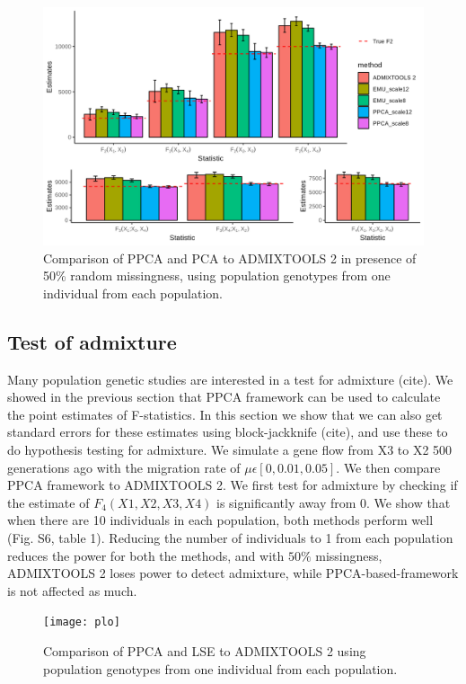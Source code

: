 \documentclass[12pt, letterpaper]{article}
\begin{document}
\begin{figure}[ht!]
    \includegraphics[width=16.5cm]{plots/simfiles/Ne1000/split_times1000/npop10_nind100/missing0.5/plots_8_12/mu0.05_plot_all_1ind_missing.png}
    \centering
    \caption{Comparison of PPCA and PCA to ADMIXTOOLS 2 in presence of 50\% random missingness, using population genotypes from one individual from each population.}
    \label{figS2:pc_scale}
\end{figure}


\subsection{Test of admixture}

Many population genetic studies are interested in a test for admixture (cite). We showed in the previous section that PPCA framework can be used to calculate the point estimates of F-statistics. In this section we show that we can also get standard errors for these estimates using block-jackknife (cite), and use these to do hypothesis testing for admixture. We simulate a gene flow from X3 to X2 500 generations ago with the migration rate of $\mu \epsilon [0, 0.01, 0.05]$. We then compare PPCA framework to ADMIXTOOLS 2. We first test for admixture by checking if the estimate of $F_4(X1,X2,X3,X4)$ is significantly away from 0. We show that when there are 10 individuals in each population, both methods perform well (Fig. S6, table 1). Reducing the number of individuals to 1 from each population reduces the power for both the methods, and with $50\%$ missingness, ADMIXTOOLS 2 loses power to detect admixture, while PPCA-based-framework is not affected as much.

\begin{figure}[ht!]
    \texttt{[image: plo]}
    \centering
    \caption{Comparison of PPCA and LSE to ADMIXTOOLS 2 using population genotypes from one individual from each population.}
    \label{figS2:pc_scale}
\end{figure}
\end{document}
